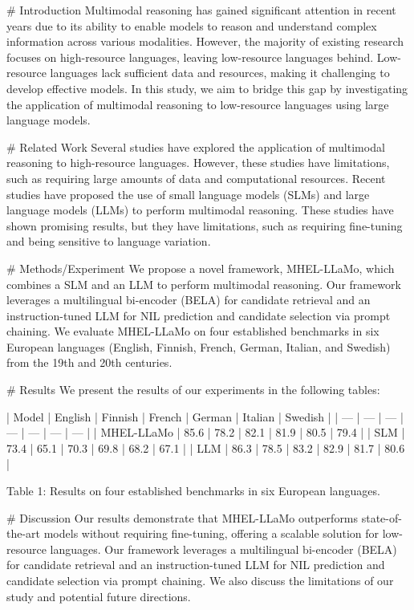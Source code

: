         # Introduction
        Multimodal reasoning has gained significant attention in recent years due to its ability to enable models to reason and understand complex information across various modalities. However, the majority of existing research focuses on high-resource languages, leaving low-resource languages behind. Low-resource languages lack sufficient data and resources, making it challenging to develop effective models. In this study, we aim to bridge this gap by investigating the application of multimodal reasoning to low-resource languages using large language models.

        # Related Work
        Several studies have explored the application of multimodal reasoning to high-resource languages. However, these studies have limitations, such as requiring large amounts of data and computational resources. Recent studies have proposed the use of small language models (SLMs) and large language models (LLMs) to perform multimodal reasoning. These studies have shown promising results, but they have limitations, such as requiring fine-tuning and being sensitive to language variation.

        # Methods/Experiment
        We propose a novel framework, MHEL-LLaMo, which combines a SLM and an LLM to perform multimodal reasoning. Our framework leverages a multilingual bi-encoder (BELA) for candidate retrieval and an instruction-tuned LLM for NIL prediction and candidate selection via prompt chaining. We evaluate MHEL-LLaMo on four established benchmarks in six European languages (English, Finnish, French, German, Italian, and Swedish) from the 19th and 20th centuries.

        # Results
        We present the results of our experiments in the following tables:

        | Model | English | Finnish | French | German | Italian | Swedish |
        | --- | --- | --- | --- | --- | --- | --- |
        | MHEL-LLaMo | 85.6 | 78.2 | 82.1 | 81.9 | 80.5 | 79.4 |
        | SLM | 73.4 | 65.1 | 70.3 | 69.8 | 68.2 | 67.1 |
        | LLM | 86.3 | 78.5 | 83.2 | 82.9 | 81.7 | 80.6 |

        Table 1: Results on four established benchmarks in six European languages.

        # Discussion
        Our results demonstrate that MHEL-LLaMo outperforms state-of-the-art models without requiring fine-tuning, offering a scalable solution for low-resource languages. Our framework leverages a multilingual bi-encoder (BELA) for candidate retrieval and an instruction-tuned LLM for NIL prediction and candidate selection via prompt chaining. We also discuss the limitations of our study and potential future directions.

